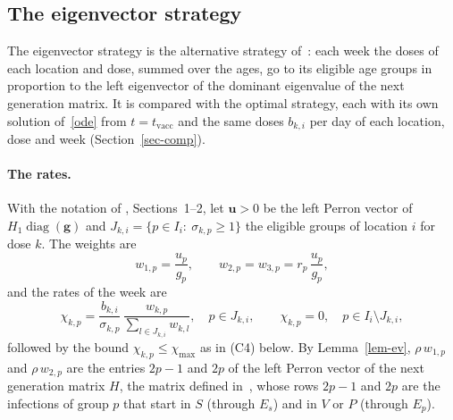 \documentclass[11pt]{article}
\theoremstyle{remark}
\newcommand{\src}[1]{\path{#1}}
\begin{document}
\subsection{The eigenvector strategy}\label{sec-ev}

The eigenvector strategy is the alternative strategy
of~\cite[Section~2.2 and Appendix~A]{2026Feng_Day_Glasser}: each week the doses of each
location and dose, summed over the ages, go to its eligible age groups in proportion to the
left eigenvector of the dominant eigenvalue of the next generation matrix. It is compared
with the optimal strategy, each with its own solution of~\eqref{ode} from
$t=t_{\mathrm{vacc}}$ and the same doses $b_{k,i}$ per day of each location, dose and week
(Section~\ref{sec-comp}).

\paragraph{The rates.} With the notation of \src{stratified_seir_ngm.tex}, Sections~1--2,
let $\bm u>0$ be the left Perron vector of $H_1\operatorname{diag}(\bm g)$ and
$J_{k,i}=\{p\in I_i:\ \sigma_{k,p}\ge1\}$ the eligible groups of location $i$ for dose
$k$. The weights are
\begin{equation}\label{w-ev}
w_{1,p}=\frac{u_p}{g_p},\qquad w_{2,p}=w_{3,p}=r_p\,\frac{u_p}{g_p},
\end{equation}
and the rates of the week are
\begin{equation}\label{chi-ev}
\chi_{k,p}=\frac{b_{k,i}}{\sigma_{k,p}}\,\frac{w_{k,p}}{\sum_{l\in J_{k,i}}w_{k,l}},\quad
p\in J_{k,i},\qquad\chi_{k,p}=0,\quad p\in I_i\setminus J_{k,i},
\end{equation}
followed by the bound $\chi_{k,p}\le\chi_{\max}$ as in (C4) below. By Lemma~\ref{lem-ev},
$\rho\,w_{1,p}$ and $\rho\,w_{2,p}$ are the entries $2p-1$ and $2p$ of the left Perron vector
of the next generation matrix $H$, the matrix defined in~\cite[Appendix~A]{2026Feng_Day_Glasser},
whose rows $2p-1$ and $2p$ are the infections of group $p$ that start in $S$ (through $E_s$)
and in $V$ or $P$ (through $E_p$).
\end{document}
